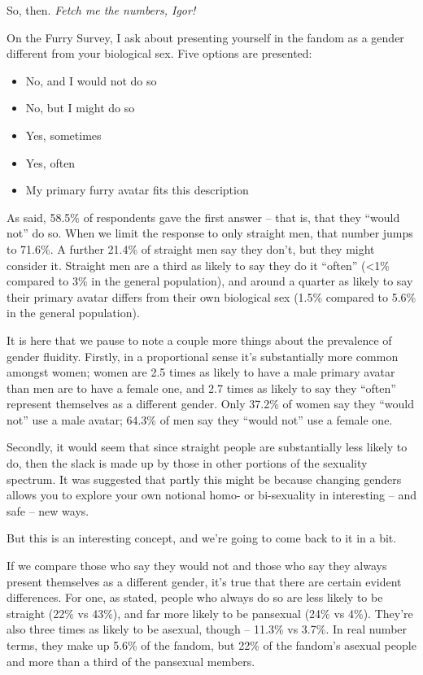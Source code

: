 So, then. \textit{Fetch me the numbers, Igor!}

On the Furry Survey, I ask about presenting yourself in the fandom as a gender different from your biological sex. Five options are presented:

\begin{itemize}
  \item No, and I would not do so
  \item No, but I might do so
  \item Yes, sometimes
  \item Yes, often
  \item My primary furry avatar fits this description
\end{itemize}

As said, 58.5\% of respondents gave the first answer -- that is, that they ``would not'' do so. When we limit the response to only straight men, that number jumps to 71.6\%. A further 21.4\% of straight men say they don’t, but they might consider it. Straight men are a third as likely to say they do it ``often'' (<1\% compared to 3\% in the general population), and around a quarter as likely to say their primary avatar differs from their own biological sex (1.5\% compared to 5.6\% in the general population).

It is here that we pause to note a couple more things about the prevalence of gender fluidity. Firstly, in a proportional sense it’s substantially more common amongst women; women are 2.5 times as likely to have a male primary avatar than men are to have a female one, and 2.7 times as likely to say they ``often'' represent themselves as a different gender. Only 37.2\% of women say they ``would not'' use a male avatar; 64.3\% of men say they ``would not'' use a female one.

Secondly, it would seem that since straight people are substantially less likely to do, then the slack is made up by those in other portions of the sexuality spectrum. It was suggested that partly this might be because changing genders allows you to explore your own notional homo- or bi-sexuality in interesting -- and safe -- new ways.

But this is an interesting concept, and we’re going to come back to it in a bit.

If we compare those who say they would not and those who say they always present themselves as a different gender, it’s true that there are certain evident differences. For one, as stated, people who always do so are less likely to be straight (22\% vs 43\%), and far more likely to be pansexual (24\% vs 4\%). They’re also three times as likely to be asexual, though -- 11.3\% vs 3.7\%. In real number terms, they make up 5.6\% of the fandom, but 22\% of the fandom’s asexual people and more than a third of the pansexual members.


